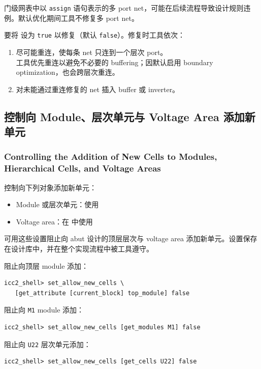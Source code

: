门级网表中以 \texttt{assign} 语句表示的多 port net，可能在后续流程导致设计规则违例。默认优化期间工具不修复多 port net。

要将  设为 \texttt{true} 以修复（默认 \texttt{false}）。修复时工具依次：
\begin{enumerate}
  \item 尽可能重连，使每条 net 只连到一个层次 port。\\
        工具优先重连以避免不必要的 buffering；因默认启用 boundary optimization，也会跨层次重连。
  \item 对未能通过重连修复的 net 插入 buffer 或 inverter。
\end{enumerate}

\subsection{控制向 Module、层次单元与 Voltage Area 添加新单元}
\subsubsection*{Controlling the Addition of New Cells to Modules, Hierarchical Cells, and Voltage Areas}

控制向下列对象添加新单元：
\begin{itemize}
  \item Module 或层次单元：使用 
  \item Voltage area：在  中使用 
\end{itemize}

可用这些设置阻止向 abut 设计的顶层层次与 voltage area 添加新单元。设置保存在设计库中，并在整个实现流程中被工具遵守。

阻止向顶层 module 添加：
\begin{lstlisting}
icc2_shell> set_allow_new_cells \
   [get_attribute [current_block] top_module] false
\end{lstlisting}

阻止向 \texttt{M1} module 添加：
\begin{lstlisting}
icc2_shell> set_allow_new_cells [get_modules M1] false
\end{lstlisting}

阻止向 \texttt{U22} 层次单元添加：
\begin{lstlisting}
icc2_shell> set_allow_new_cells [get_cells U22] false
\end{lstlisting}

